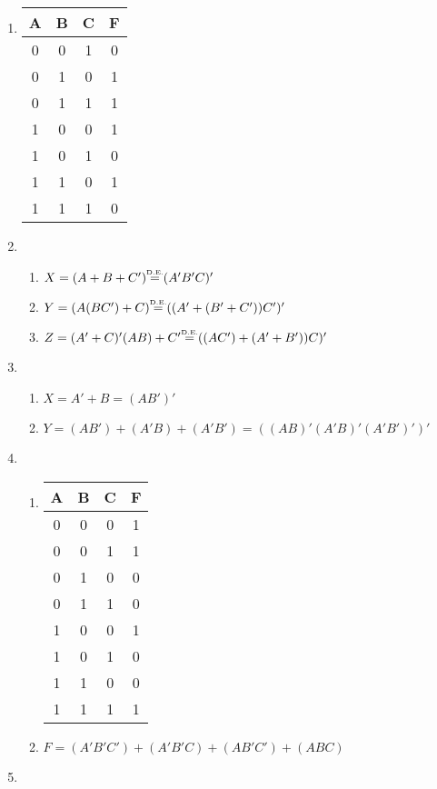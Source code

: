 \documentclass{article}
\newcommand\de{\stackrel{\mathclap{\normalfont\mbox{{\tiny D.E.}}}}{=}}
\begin{document}
\begin{enumerate}
\item
\begin{tabular}{|c|c|c||c|}
\hline
A & B & C & F \\
\hline
\hline
  0	&   0	&  	1&	0   \\
  0 	&   1 	&	0& 	1  \\
  0	&   1	&	1&       1 \\
  1	&   0	& 	0&       1 \\
  1	&   0	&	1&      0\\
  1	&   1	&	0&       1\\
  1	&   1	&	1&     0\\

\hline
\end{tabular}
\item
\begin{enumerate}
\item $X=(A+B+C')\de (A' B'  C)'$
\item $Y=(A(BC')+C)\de ((A' +( B'+C'))C')'$
\item $Z=(A'+C)'(AB)+C'\de ((AC')+(A'+B'))C)'$
\end{enumerate}
\item 
\begin{enumerate}
\item $X=A'+B=(AB')'$
\item $Y=(AB')+(A'B)+(A'B')=((AB)'(A'B)'(A'B')')'$
\end{enumerate}
\item
\begin{enumerate}
\item
\begin{tabular}{|c|c|c||c|}
\hline
A & B & C & F \\
\hline
\hline
0 & 0 & 0 & 1 \\
0 & 0 & 1 & 1 \\
0 & 1 & 0 & 0 \\
0 & 1 & 1 & 0 \\
1 & 0 & 0 & 1 \\
1 & 0 & 1 & 0 \\
1 & 1 & 0 & 0 \\
1 & 1 & 1 & 1\\
\hline
\end{tabular}
\item
$F=(A'B'C')+(A'B'C)+(AB'C')+(ABC)$
\end{enumerate}
\item
\begin{enumerate}


\end{enumerate}
\end{enumerate}
\end{document}
